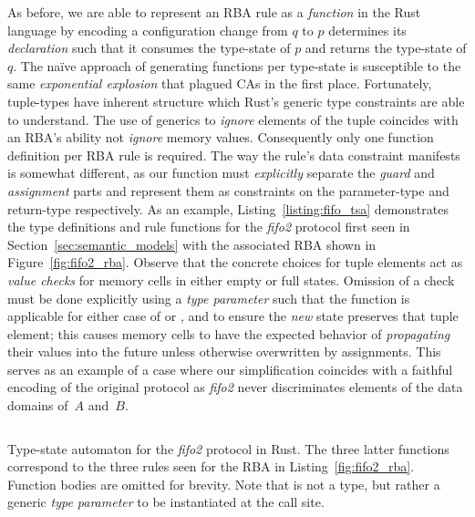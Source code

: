 As before, we are able to represent an RBA rule as a \textit{function} in the Rust language by encoding a configuration change from $q$ to $p$ determines its \textit{declaration} such that it consumes the type-state of $p$ and returns the type-state of $q$. The na{\"i}ve approach of generating functions per type-state is susceptible to the same \textit{exponential explosion} that plagued CAs in the first place. Fortunately, tuple-types have inherent structure which Rust's generic type constraints are able to understand. The use of generics to \textit{ignore} elements of the tuple coincides with an RBA's ability not \textit{ignore} memory values. Consequently only one function definition per RBA rule is required. The way the rule's data constraint manifests is somewhat different, as our function must \textit{explicitly} separate the \textit{guard} and \textit{assignment} parts and represent them as constraints on the parameter-type and return-type respectively. As an example, Listing~\ref{listing:fifo_tsa} demonstrates the type definitions and rule functions for the \textit{fifo2} protocol first seen in Section~\ref{sec:semantic_models} with the associated RBA shown in Figure~\ref{fig:fifo2_rba}. Observe that the concrete choices for tuple elements act as \textit{value checks} for memory cells in either empty or full states. Omission of a check must be done explicitly using a \textit{type parameter} such that the function is applicable for either case of  or , and to ensure the \textit{new} state preserves that tuple element; this causes memory cells to have the expected behavior of \textit{propagating} their values into the future unless otherwise overwritten by assignments. This serves as an example of a case where our simplification coincides with a faithful encoding of the original protocol as \textit{fifo2} never discriminates elements of the data domains of~$A$ and~$B$.


\begin{listing}[ht]
	\inputminted[]{rust}{fifo_tsa.rs}
	\caption[Type state automaton in Rust for the fifo2 connector.]{Type-state automaton for the \textit{fifo2} protocol in Rust. The three latter functions correspond to the three rules seen for the RBA in Listing~\ref{fig:fifo2_rba}. Function bodies are omitted for brevity. Note that  is not a type, but rather a generic \textit{type parameter} to be instantiated at the call site.}
	\label{listing:fifo_tsa}
\end{listing}



